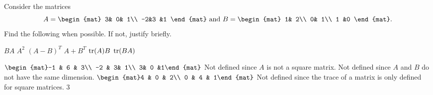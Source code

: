 
\begin{Exercise}[
name={},
title={}, 
difficulty=0,
origin={\cite{MH}}]
Consider the matrices \[A=\begin{mat}
3& 0& 1\\
-2&3 &1
\end{mat}
\text{ and }
B=\begin{mat}
1& 2\\
0& 1\\
1 &0
\end{mat}.\]
Find the following when possible. If not, justify briefly.
\begin{multicols}{4}
\Question $BA$
\Question $A^2$
\Question $(A-B)^T$
\Question $A+B^T$
\Question $\operatorname{tr}(A)B$
\Question $\operatorname{tr}(BA)$
\EndCurrentQuestion
\end{multicols}
\end{Exercise}

\begin{Answer}
\Question $\begin{mat}-1 & 6 & 3\\ -2 & 3& 1\\ 3& 0 &1\end{mat}$
\Question Not defined since $A$ is not a square matrix.
\Question Not defined since $A$ and $B$ do not have the same dimension.
\Question $\begin{mat}4 & 0 & 2\\ 0 & 4 & 1\end{mat}$
\Question Not defined since the trace of a matrix is only defined for square matrices.
\Question $3$
\end{Answer}
